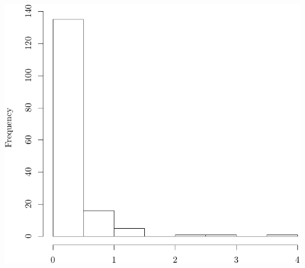 \documentclass{article}\usepackage[]{graphicx}\usepackage[]{color}
\makeatletter
\def\maxwidth{ %
  \ifdim\Gin@nat@width>\linewidth
    \linewidth
  \else
    \Gin@nat@width
  \fi
}
\newenvironment{knitrout}{}{} %
\makeatother
\begin{document}
\begin{knitrout}
{\centering \includegraphics[width=\maxwidth]{figure/07-E3-E3-summary-2} 

}



\end{knitrout}
\end{document}
